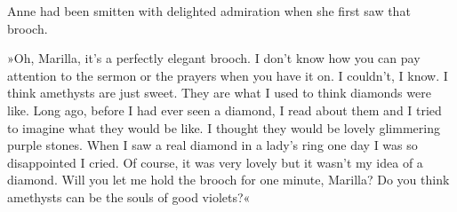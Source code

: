 Anne had been smitten with delighted admiration when she first saw that brooch.

»Oh, Marilla, it’s a perfectly elegant brooch. I don’t know how you can pay attention to the sermon or the prayers when you have it on. I couldn’t, I know. I think amethysts are just sweet. They are what I used to think diamonds were like. Long ago, before I had ever seen a diamond, I read about them and I tried to imagine what they would be like. I thought they would be lovely glimmering purple stones. When I saw a real diamond in a lady’s ring one day I was so disappointed I cried. Of course, it was very lovely but it wasn’t my idea of a diamond. Will you let me hold the brooch for one minute, Marilla? Do you think amethysts can be the souls of good violets?«
